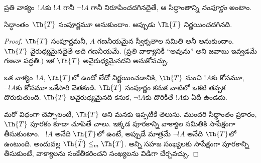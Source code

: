 \documentclass[../../../include/open-logic-section]{subfiles}
\begin{document}


ప్రతి వాక్యం~$!A$కు $!A$ గానీ $\lnot !A$ గానీ నిరూపించదగినదైతే, ఆ
సిద్ధాంతాన్ని {\em సంపూర్ణం} అంటాం.

\begin{lem}
సిద్ధాంతం~$\Th{T}$ సంపూర్ణమూ  అనుకుందాం. అప్పుడు
$\Th{T}$ నిర్ణయించదగినది.
\end{lem}

\begin{proof}
$\Th{T}$ సంపూర్ణమనీ, $A$ గణనీయమైన స్వీకృతాల సమితి అనీ అనుకుందాం.
$\Th{T}$ వైరుధ్యమైనదైతే అది గణనీయమే. (ప్రతి వాక్యానికీ ``అవును'' అని
జవాబు ఇవ్వడమే గణనా పద్ధతి.) ఇక $\Th{T}$ అవైరుధ్యమైనదని అనుకోవచ్చు.

ఒక వాక్యం~$!A$, $\Th{T}$లో ఉందో లేదో నిర్ణయించడానికి, $\Th{T}$ నుంచి
$!A$కు  కోసమూ, $\lnot !A$కు  కోసమూ ఒకేసారి
వెతకండి. $\Th{T}$ సంపూర్ణం కనుక వాటిలో ఒకటి తప్పక దొరుకుతుంది.
$\Th{T}$ అవైరుధ్యమైనది కనుక, $\lnot !A$కు  దొరికితే $!A$కు
 ఏదీ ఉండదు.

మరో విధంగా చెప్పాలంటే, $\Th{T}$ 
అని మనకు ఇప్పటికే తెలుసు. ముందరి సిద్ధాంతం ప్రకారం, $\Th{T}$ పూరకం కూడా
 చూపితే చాలు. ఇక్కడ పూరకాన్ని వాక్యాల
సమితికి సాపేక్షంగా తీసుకుంటాం. ~$!A$ అనేది $\Th{\bar T}$లో
ఉంటే, అప్పుడే మాత్రమే $\lnot !A$ అనేది $\Th{T}$లో ఉంటుంది. అందువల్ల
$\Th{\bar T} \leq_m \Th{T}$. అన్ని సహజ సంఖ్యలకు సాపేక్షంగా పూరకాన్ని
తీసుకుంటే, వాక్యాలను సంకేతీకరించని సంఖ్యలను విడిగా చేర్చవచ్చు.
\end{proof}
\end{document}
